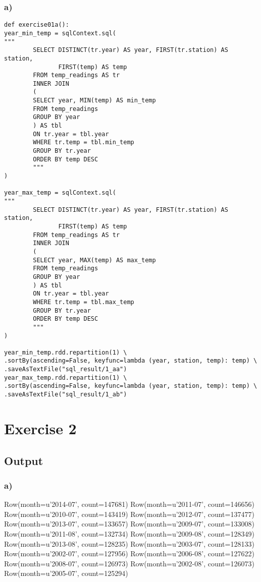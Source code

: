 \documentclass[10pt]{article}
\begin{document}
\subsubsection*{a)}
\label{sec-1-2-3}
\begin{verbatim}
def exercise01a():
year_min_temp = sqlContext.sql(
"""
        SELECT DISTINCT(tr.year) AS year, FIRST(tr.station) AS station, 
               FIRST(temp) AS temp
        FROM temp_readings AS tr
        INNER JOIN
        (
        SELECT year, MIN(temp) AS min_temp
        FROM temp_readings
        GROUP BY year
        ) AS tbl
        ON tr.year = tbl.year
        WHERE tr.temp = tbl.min_temp
        GROUP BY tr.year
        ORDER BY temp DESC
        """
)

year_max_temp = sqlContext.sql(
"""
        SELECT DISTINCT(tr.year) AS year, FIRST(tr.station) AS station, 
               FIRST(temp) AS temp
        FROM temp_readings AS tr
        INNER JOIN
        (
        SELECT year, MAX(temp) AS max_temp
        FROM temp_readings
        GROUP BY year
        ) AS tbl
        ON tr.year = tbl.year
        WHERE tr.temp = tbl.max_temp
        GROUP BY tr.year
        ORDER BY temp DESC
        """
)

year_min_temp.rdd.repartition(1) \
.sortBy(ascending=False, keyfunc=lambda (year, station, temp): temp) \
.saveAsTextFile("sql_result/1_aa")
year_max_temp.rdd.repartition(1) \
.sortBy(ascending=False, keyfunc=lambda (year, station, temp): temp) \
.saveAsTextFile("sql_result/1_ab")
\end{verbatim}

\newpage
\section*{Exercise 2}
\label{sec-2}
\subsection*{Output}
\label{sec-2-1}
\subsubsection*{a)}
\label{sec-2-1-1}
Row(month=u'2014-07', count=147681)
Row(month=u'2011-07', count=146656)
Row(month=u'2010-07', count=143419)
Row(month=u'2012-07', count=137477)
Row(month=u'2013-07', count=133657)
Row(month=u'2009-07', count=133008)
Row(month=u'2011-08', count=132734)
Row(month=u'2009-08', count=128349)
Row(month=u'2013-08', count=128235)
Row(month=u'2003-07', count=128133)
Row(month=u'2002-07', count=127956)
Row(month=u'2006-08', count=127622)
Row(month=u'2008-07', count=126973)
Row(month=u'2002-08', count=126073)
Row(month=u'2005-07', count=125294)
\end{document}
